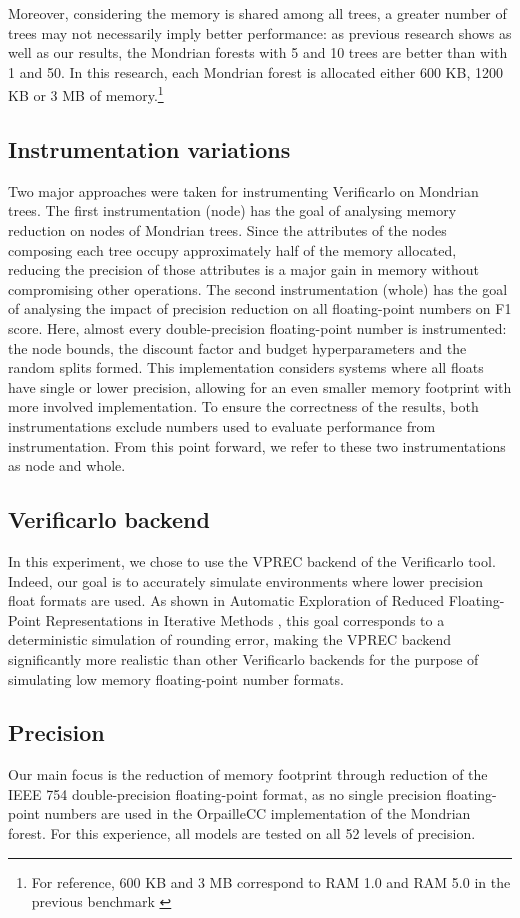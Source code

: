 \documentclass[conference]{IEEEtran}
\begin{document}
Moreover, considering the memory is shared among all trees, a greater number of trees may not necessarily imply better performance: as previous research \cite{khannouz2020benchmark} shows as well as our results, the Mondrian forests with 5 and 10 trees are better than with 1 and 50. In this research, each Mondrian forest is allocated either 600 KB, 1200 KB or 3 MB of memory.\footnote{For reference, 600 KB and 3 MB correspond to RAM 1.0 and RAM 5.0 in the previous benchmark \cite{khannouz2020benchmark}}
\subsection{Instrumentation variations}
Two major approaches were taken for instrumenting Verificarlo on Mondrian trees. 
The first instrumentation (node) has the goal of analysing memory reduction on nodes of Mondrian trees. Since the attributes of the nodes composing each tree occupy approximately half of the memory allocated, reducing the precision of those attributes is a major gain in memory without compromising other operations.
The second instrumentation (whole) has the goal of analysing the impact of precision reduction on all floating-point numbers on F1 score. Here, almost every double-precision floating-point number is instrumented: the node bounds, the discount factor and budget hyperparameters and the random splits formed. This implementation considers systems where all floats have single or lower precision, allowing for an even smaller memory footprint with more involved implementation. 
To ensure the correctness of the results, both instrumentations exclude numbers used to evaluate performance from instrumentation. From this point forward, we refer to these two instrumentations as node and whole.
\subsection{Verificarlo backend}
In this experiment, we chose to use the VPREC backend of the Verificarlo tool. Indeed, our goal is to accurately simulate environments where lower precision float formats are used. As shown in Automatic Exploration of Reduced Floating-Point Representations in Iterative Methods \cite{chatelain2019automatic}, this goal corresponds to a deterministic simulation of rounding error, making the VPREC backend significantly more realistic than other Verificarlo backends for the purpose of simulating low memory floating-point number formats.
\subsection{Precision}
Our main focus is the reduction of memory footprint through reduction of the IEEE 754 double-precision floating-point format, as no single precision floating-point numbers are used in the OrpailleCC implementation of the Mondrian forest. For this experience, all models are tested on all 52 levels of precision.
\end{document}
